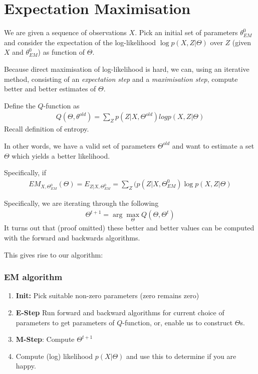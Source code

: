 \documentclass{article}
\begin{document}
  
  






  \section{Expectation Maximisation}
        We are given a sequence of observations $X$. Pick an initial set of parameters $\theta^0_{EM}$ and consider the expectation of the log-likelihood $\log p(X, Z | \Theta)$ over $Z$ (given $X$ and $\theta^0_{EM}$) as function of $\Theta$. 
        
        Because direct maximisation of log-likelihood is hard, we can, using an iterative method, consisting of an \emph{expectation step} and a \emph{maximisation step}, compute better and better estimates of $\Theta$. 
        
      Define the $Q$-function as 
      \begin{align}
        Q(\Theta, \theta^{old}) = \sum_{Z}p(Z | X, \Theta^{old}) logp(X, Z | \Theta)
      \end{align}
        Recall definition of entropy. 
        
        In other words, we have a valid set of parameters $\Theta^{old}$ and want to estimate a set $\Theta$ which yields a better likelihood.
      
        Specifically, if
        \begin{align}
            EM_{X, \Theta^0_{EM}}(\Theta) = E_{Z | X, \Theta^0_{EM}} = \sum_{Z}(p(Z | X, \Theta^0_{EM}) \log p(X, Z | \Theta)
        \end{align}
        
        Specifically, we are iterating through the following
        \begin{align}
            \Theta^{t+1} = \arg \max_{\Theta} Q(\Theta, \Theta^{t})
        \end{align}
        It turns out that (proof omitted) these better and better values can be computed with the forward and backwards algorithms. 
        
        This gives rise to our algorithm:
        
      \subsubsection{EM algorithm}
      
        \begin{enumerate}
            \item \textbf{Init:} Pick suitable non-zero parameters (zero remains zero)
            \item \textbf{E-Step} Run forward and backward algorithms for current choice of parameters to get parameters of $Q$-function, or, enable us to construct $\Theta$s.
            \item \textbf{M-Step}: Compute $\Theta^{t+1}$
            \item Compute (log) likelihood $p( X | \Theta)$ and use this to determine if you are happy.
        \end{enumerate}
        
\end{document}
